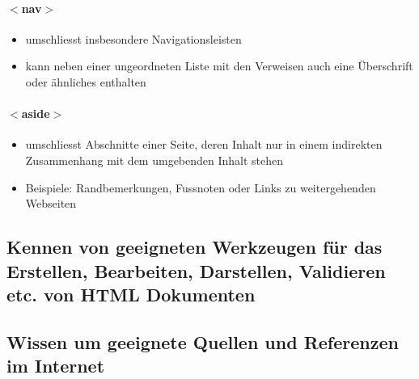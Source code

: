 \paragraph{$<$nav$>$}
\begin{itemize}[noitemsep,topsep=0pt,leftmargin=*]
    \item umschliesst insbesondere Navigationsleisten
    \item kann neben einer ungeordneten Liste mit den Verweisen auch eine Überschrift oder ähnliches enthalten
\end{itemize}

\paragraph{$<$aside$>$}
\begin{itemize}[noitemsep,topsep=0pt,leftmargin=*]
    \item umschliesst Abschnitte einer Seite, deren Inhalt nur in einem indirekten Zusammenhang mit dem umgebenden Inhalt stehen
    \item Beispiele: Randbemerkungen, Fussnoten oder Links zu weitergehenden Webseiten
\end{itemize}


\subsection{Kennen von \textbf{geeigneten Werkzeugen} für das Erstellen, Bearbeiten, Darstellen, Validieren etc. von HTML Dokumenten}

\subsection{Wissen um geeignete \textbf{Quellen und Referenzen} im Internet}
